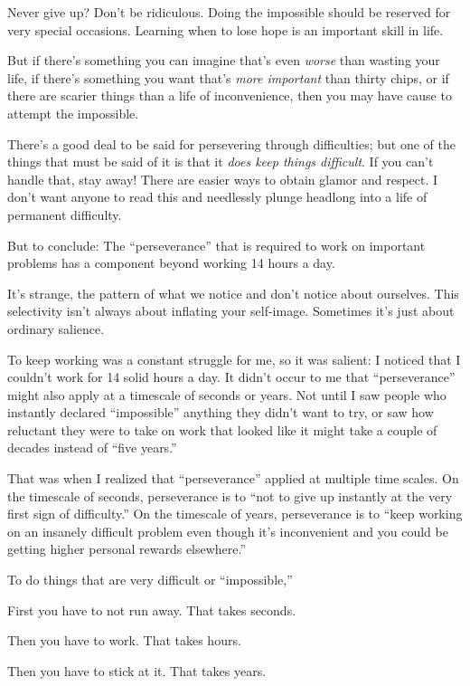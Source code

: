 {
 Never give up? Don't be ridiculous. Doing the
impossible should be reserved for very special occasions. Learning when
to lose hope is an important skill in life.}

{
 But if there's something you can imagine
that's even \textit{worse} than wasting your life, if
there's something you want that's
\textit{more important} than thirty chips, or if there are scarier
things than a life of inconvenience, then you may have cause to attempt
the impossible.}

{
 There's a good deal to be said for persevering
through difficulties; but one of the things that must be said of it is
that it \textit{does keep things difficult}. If you
can't handle that, stay away! There are easier ways to
obtain glamor and respect. I don't want anyone to read
this and needlessly plunge headlong into a life of permanent
difficulty.}

{
 But to conclude: The
``perseverance'' that is required to
work on important problems has a component beyond working 14 hours a
day.}

{
 It's strange, the pattern of what we notice and
don't notice about ourselves. This selectivity
isn't always about inflating your self-image. Sometimes
it's just about ordinary salience.}

{
 To keep working was a constant struggle for me, so it was salient:
I noticed that I couldn't work for 14 solid hours a
day. It didn't occur to me that
``perseverance'' might also apply at
a timescale of seconds or years. Not until I saw people who instantly
declared ``impossible'' anything
they didn't want to try, or saw how reluctant they were
to take on work that looked like it might take a couple of decades
instead of ``five years.''}

{
 That was when I realized that
``perseverance'' applied at multiple
time scales. On the timescale of seconds, perseverance is to
``not to give up instantly at the very first sign of
difficulty.'' On the timescale of years, perseverance
is to ``keep working on an insanely difficult problem
even though it's inconvenient and you could be getting
higher personal rewards elsewhere.''}

{
 To do things that are very difficult or
``impossible,''}

{
 First you have to not run away. That takes seconds.}

{
 Then you have to work. That takes hours.}

{
 Then you have to stick at it. That takes years.}

